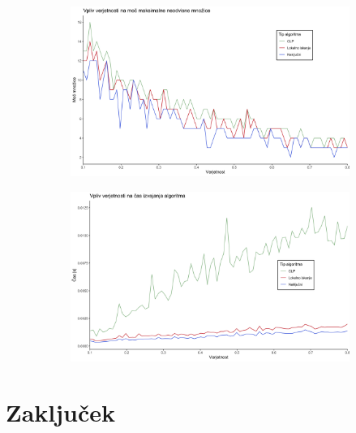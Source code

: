 \documentclass[a4paper, 12pt]{article}
\begin{document}
\begin{figure}[h!]
	\begin{center}
		\begin{subfigure}{0.49\textwidth}
		\begin{center}
			\includegraphics[width=\textwidth]{R_koda/ver-moc.png}
	\end{center}
		\end{subfigure}
		\begin{subfigure}{0.49\textwidth}
		\begin{center}
			\includegraphics[width=\textwidth]{R_koda/ver-cas.png}
	\end{center}
		\end{subfigure}
	\end{center}
	\end{figure}



	
\section{Zaključek}
\end{document}
